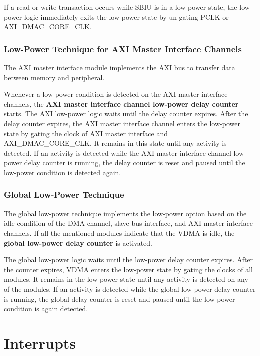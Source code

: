\documentclass[main\_\_EN.tex]{subfiles}
\begin{document}
If a read or write transaction occurs while SBIU is in a low-power state, the low-power logic immediately exits the low-power state by un-gating PCLK or AXI\_DMAC\_CORE\_CLK.

\subsubsection{Low-Power Technique for AXI Master Interface Channels}

The AXI master interface module implements the AXI bus to transfer data between memory and peripheral.

Whenever a low-power condition is detected on the AXI master interface channels, the \textbf{AXI master interface channel low-power delay counter} starts. The AXI low-power logic waits until the delay counter expires. After the delay counter expires, the AXI master interface channel enters the low-power state by gating the clock of AXI master interface and AXI\_DMAC\_CORE\_CLK. It remains in this state until any activity is detected. If an activity is detected while the AXI master interface channel low-power delay counter is running, the delay counter is reset and paused until the low-power condition is detected again.

\subsubsection{Global Low-Power Technique}

The global low-power technique implements the low-power option based on the idle condition of the DMA channel, slave bus interface, and AXI master interface channels. If all the mentioned modules indicate that the VDMA is idle, the \textbf{global low-power delay counter} is activated.

The global low-power logic waits until the low-power delay counter expires. After the counter expires, VDMA enters the low-power state by gating the clocks of all modules. It remains in the low-power state until any activity is detected on any of the modules. If an activity is detected while the global low-power delay counter is running, the global delay counter is reset and paused until the low-power condition is again detected.


\section{Interrupts}
\end{document}
